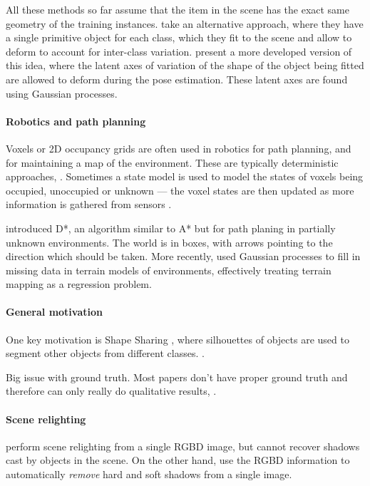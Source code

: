 \documentclass[10pt,twocolumn,letterpaper]{article}
\begin{document}
All these methods so far assume that the item in the scene has the exact same geometry of the training instances.
\cite{cocias-cgvcv-2013} take an alternative approach, where they have a single primitive object for each class, which they fit to the scene and allow to deform to account for inter-class variation.
\cite{prisacariu-iccv-2011} present a more developed version of this idea, where the latent axes of variation of the shape of the object being fitted are allowed to deform during the pose estimation. 
These latent axes are found using Gaussian processes.

\paragraph{Robotics and path planning}
Voxels or 2D occupancy grids are often used in robotics for path planning, and for maintaining a map of the environment. 
These are typically deterministic approaches, \eg \cite{jetchev-icra-2010}. Sometimes a state model is used to model the states of voxels being occupied, unoccupied or unknown --- the voxel states are then updated as more information is gathered from sensors \cite{toussaint-techreport-2007}.

\cite{stentz-icra-1994} introduced D*, an algorithm similar to A* but for path planing in partially unknown environments. 
The world is in boxes, with arrows pointing to the direction which should be taken.
More recently, \cite{plagemann-iros-2008} used Gaussian processes to fill in missing data in terrain models of environments, effectively treating terrain mapping as a regression problem.

\paragraph{General motivation}
One key motivation is Shape Sharing \cite{kim-eccv-2012}, where silhouettes of objects are used to segment other objects from different classes.
 \cite{nan-acm-2012}.

Big issue with ground truth. Most papers don't have proper ground truth and therefore can only really do qualitative results, \eg \cite{all the papers...}.

\paragraph{Scene relighting}
\cite{ikeda-acpr-2013} perform scene relighting from a single RGBD image, but cannot recover shadows cast by objects in the scene.
On the other hand, \cite{xiao-cvpr-2014} use the RGBD information to automatically \textit{remove} hard and soft shadows from a single image.
\end{document}
